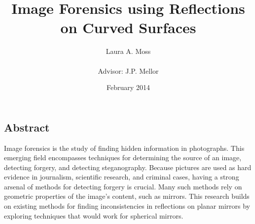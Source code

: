 \title{Image Forensics using Reflections on Curved Surfaces}
\author{Laura A. Moss\\ \\Advisor: J.P. Mellor}
\date{February 2014}
\maketitle

\newpage

\subsection*{Abstract}
Image forensics is the study of finding hidden information in photographs. This emerging field encompasses techniques for determining the source of an image, detecting forgery, and detecting steganography. Because pictures are used as hard evidence in journalism, scientific research, and criminal cases, having a strong arsenal of methods for detecting forgery is crucial. Many such methods rely on geometric properties of the image's content, such as mirrors. This research builds on existing methods for finding inconsistencies in reflections on planar mirrors by exploring techniques that would work for spherical mirrors.